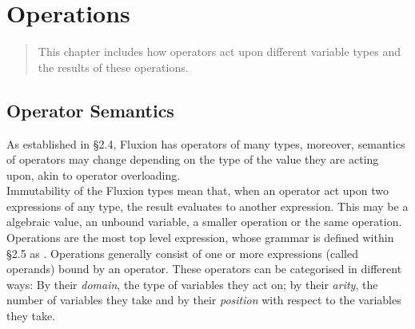 \documentclass[11pt,a4paper]{book}
\begin{document}
\chapter{Operations}
\vspace{1em}
\begin{quotation}
This chapter includes how operators act upon different variable types and the results of these operations.
\end{quotation}
\newpage

\section{Operator Semantics}

As established in \S 2.4, Fluxion has operators of many types, moreover, semantics of operators may change depending on the type of the value they are acting upon, akin to operator overloading.\\

Immutability of the Fluxion types mean that, when an operator act upon two expressions of any type, the result evaluates to another expression. This may be a algebraic value, an unbound variable, a smaller operation or the same operation.\\

Operations are the most top level expression, whose grammar is defined within \S 2.5 as . Operations generally consist of one or more expressions (called operands) bound by an operator. These operators can be categorised in different ways: By their \textit{domain}, the type of variables they act on; by their \textit{arity}, the number of variables they take and by their \textit{position} with respect to the variables they take.\\
\end{document}
